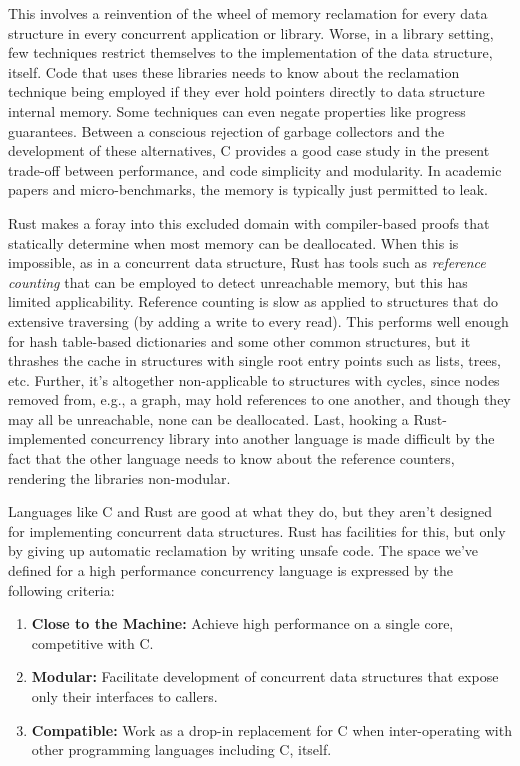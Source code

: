 This involves a reinvention of the wheel of memory reclamation for every data structure in every concurrent application or library.  Worse, in a library setting, few techniques restrict themselves to the implementation of the data structure, itself.  Code that uses these libraries needs to know about the reclamation technique being employed if they ever hold pointers directly to data structure internal memory.  Some techniques can even negate properties like progress guarantees.\cite{Brown15}  Between a conscious rejection of garbage collectors and the development of these alternatives, C provides a good case study in the present trade-off between performance, and code simplicity and modularity.  In academic papers and micro-benchmarks, the memory is typically just permitted to leak.

Rust makes a foray into this excluded domain with compiler-based proofs that statically determine when most memory can be deallocated.\cite{Rust}  When this is impossible, as in a concurrent data structure, Rust has tools such as \textit{reference counting} that can be employed to detect unreachable memory, but this has limited applicability.  Reference counting is slow as applied to structures that do extensive traversing (by adding a write to every read).  This performs well enough for hash table-based dictionaries and some other common structures, but it thrashes the cache in structures with single root entry points such as lists, trees, etc.  Further, it's altogether non-applicable to structures with cycles, since nodes removed from, e.g., a graph, may hold references to one another, and though they may all be unreachable, none can be deallocated.  Last, hooking a Rust-implemented concurrency library into another language is made difficult by the fact that the other language needs to know about the reference counters, rendering the libraries non-modular.

Languages like C and Rust are good at what they do, but they aren't designed for implementing concurrent data structures.  Rust has facilities for this, but only by giving up automatic reclamation by writing unsafe code.  The space we've defined for a high performance concurrency language is expressed by the following criteria:

\begin{enumerate}
        \item \textbf{Close to the Machine:} Achieve high performance on a single core, competitive with C.
        \item \textbf{Modular:} Facilitate development of concurrent data structures that expose only their interfaces to callers.
        \item \textbf{Compatible:} Work as a drop-in replacement for C when inter-operating with other programming languages including C, itself.
\end{enumerate}

